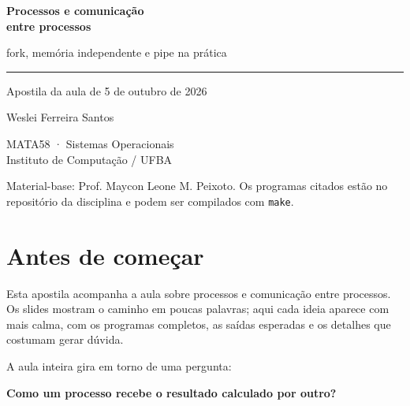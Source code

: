 \documentclass[11pt,a4paper]{article}
\newcommand{\cmd}[1]{\texttt{#1}}
\begin{document}
\begin{titlepage}
\thispagestyle{empty}
\vspace*{5cm}
{\color{mDarkTeal}\fontsize{28}{34}\selectfont\bfseries Processos e comunicação\\[0.2em] entre processos\par}
\vspace{0.8em}
{\Large\color{mDarkTeal!80} fork, memória independente e pipe na prática\par}
\vspace{1em}
{\color{mLightBrown}\rule{\linewidth}{1.2pt}}
\vspace{1em}

{\large Apostila da aula de 5 de outubro de 2026\par}
\vspace{3em}
{\large Weslei Ferreira Santos\par}
\vspace{0.6em}
MATA58 · Sistemas Operacionais\\
Instituto de Computação / UFBA

\vfill
{\small\color{black!60} Material-base: Prof. Maycon Leone M. Peixoto. Os programas citados estão no repositório da disciplina e podem ser compilados com \cmd{make}.\par}
\end{titlepage}

\tableofcontents
\clearpage

\section{Antes de começar}

Esta apostila acompanha a aula sobre processos e comunicação entre processos. Os slides mostram o caminho em poucas palavras; aqui cada ideia aparece com mais calma, com os programas completos, as saídas esperadas e os detalhes que costumam gerar dúvida.

A aula inteira gira em torno de uma pergunta:

\begin{center}
{\large\bfseries\color{mDarkTeal} Como um processo recebe o resultado calculado por outro?}
\end{center}
\end{document}
